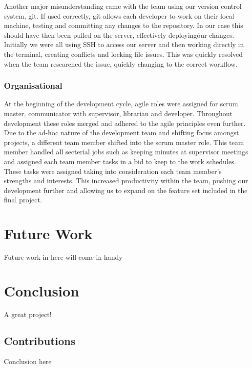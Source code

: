 \documentclass{l3proj}
\begin{document}
Another major misunderstanding came with the team using our version control system, git. If used correctly, git allows each developer to work on their local machine, testing and committing any changes to the repository. In our case this should have then been pulled on the server, effectively \'deploying\' our changes. Initially we were all using SSH to access our server and then working directly in the terminal, creating conflicts and locking file issues. This was quickly resolved when the team researched the issue, quickly changing to the correct workflow.

\subsection{Organisational}    At the beginning of the development cycle, agile roles were assigned for scrum master, communicator with supervisor, librarian and developer. Throughout development these roles merged and adhered to the agile principles even further. Due to the ad-hoc nature of the development team and shifting focus amongst projects, a different team member shifted into the scrum master role. This team member handled all secterial jobs such as keeping minutes at supervisor meetings and assigned each team member tasks in a bid to keep to the work schedules. These tasks were assigned taking into consideration each team member’s strengths and interests. This increased productivity within the team, pushing our development further and allowing us to expand on the feature set included in the final project.

\chapter{Future Work}
\label{Future Work}

Future work in here will come in handy

\chapter{Conclusion}

A great project!

\section{Contributions}

Conclusion here



\end{document}
